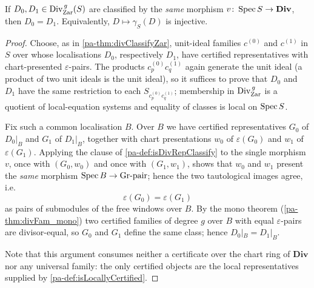 \begin{theorem}
  \label{pa-thm:eq_of_isDivRepClassify}
  \leanok

  If \(D_0, D_1 \in \operatorname{Div}^{\,g}_{\mathrm{Zar}}(S)\) are classified by the \emph{same}
  morphism \(v \colon \operatorname{Spec} S \to \mathbf{Div}\), then \(D_0 = D_1\). Equivalently,
  \(D \mapsto \gamma_S(D)\) is injective.
\end{theorem}
\begin{proof}
  \leanok
  Choose, as in \ref{pa-thm:divClassifyZar}, unit-ideal families \(c^{(0)}\) and \(c^{(1)}\) in
  \(S\) over whose localisations \(D_0\), respectively \(D_1\), have certified
  representatives with chart-presented \(\varepsilon\)-pairs. The products
  \(c^{(0)}_p c^{(1)}_q\) again generate the unit ideal (a product of two unit ideals is the
  unit ideal), so it suffices to prove that \(D_0\) and \(D_1\) have the same restriction to
  each \(S_{c^{(0)}_p c^{(1)}_q}\); membership in \(\operatorname{Div}^{\,g}_{\mathrm{Zar}}\) is a
  quotient of local-equation systems and equality of classes is local on \(\operatorname{Spec} S\).

  Fix such a common localisation \(B\). Over \(B\) we have certified representatives
  \(G_0\) of \(D_0|_B\) and \(G_1\) of \(D_1|_B\), together with chart presentations \(w_0\)
  of \(\varepsilon(G_0)\) and \(w_1\) of \(\varepsilon(G_1)\). Applying the clause of
  \ref{pa-def:isDivRepClassify} to the single morphism \(v\), once with \((G_0, w_0)\) and once
  with \((G_1, w_1)\), shows that \(w_0\) and \(w_1\) present the \emph{same} morphism
  \(\operatorname{Spec} B \to \mathrm{Gr}\text{-pair}\); hence the two tautological images agree, i.e.
  \[
    \varepsilon(G_0) = \varepsilon(G_1)
  \]
  as pairs of submodules of the free windows over \(B\). By the mono theorem
  (\ref{pa-thm:divFam_mono}) two certified families of degree \(g\) over \(B\) with equal
  \(\varepsilon\)-pairs are divisor-equal, so \(G_0\) and \(G_1\) define the same class;
  hence \(D_0|_B = D_1|_B\).

  Note that this argument consumes neither a certificate over the chart ring of
  \(\mathbf{Div}\) nor any universal family: the only certified objects are the local
  representatives supplied by \ref{pa-def:isLocallyCertified}.
\end{proof}

